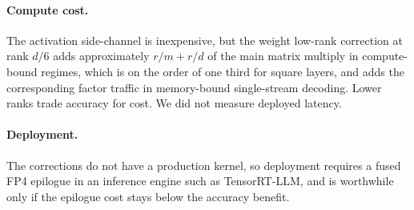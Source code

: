 \documentclass[11pt]{article}
\begin{document}
\paragraph{Compute cost.} The activation side-channel is inexpensive, but the weight
low-rank correction at rank $d/6$ adds approximately $r/m + r/d$ of the main matrix
multiply in compute-bound regimes, which is on the order of one third for square layers,
and adds the corresponding factor traffic in memory-bound single-stream decoding. Lower
ranks trade accuracy for cost. We did not measure deployed latency.

\paragraph{Deployment.} The corrections do not have a production kernel, so deployment
requires a fused FP4 epilogue in an inference engine such as TensorRT-LLM, and is
worthwhile only if the epilogue cost stays below the accuracy benefit.
\end{document}
